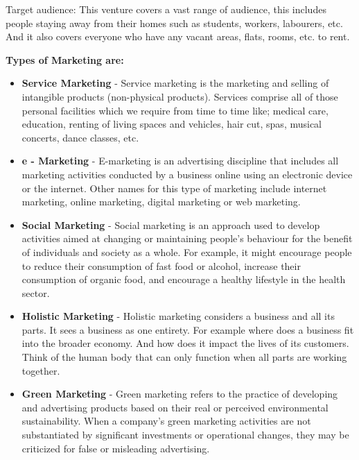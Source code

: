 \documentclass{article}
\begin{document}
Target audience: This venture covers a vast range of audience, this includes people staying away from their homes such as students, workers, labourers, etc. And it also covers everyone who have any vacant areas, flats, rooms, etc. to rent.

\setlength{\parskip}{1em}

\large{\textbf{Types of Marketing are: }}
\begin{itemize}
    \item {\textbf{Service Marketing}} - Service marketing is the marketing and selling of intangible products (non-physical products). Services comprise all of those personal facilities which we require from time to time like; medical care, education, renting of living spaces and vehicles, hair cut, spas, musical concerts, dance classes, etc.
    \item {\textbf{e - Marketing}} - E-marketing is an advertising discipline that includes all marketing activities conducted by a business online using an electronic device or the internet. Other names for this type of marketing include internet marketing, online marketing, digital marketing or web marketing.
    \item {\textbf{Social Marketing}} - Social marketing is an approach used to develop activities aimed at changing or maintaining people's behaviour for the benefit of individuals and society as a whole. For example, it might encourage people to reduce their consumption of fast food or alcohol, increase their consumption of organic food, and encourage a healthy lifestyle in the health sector.
    \item {\textbf{Holistic Marketing}} - Holistic marketing considers a business and all its parts. It sees a business as one entirety. For example where does a business fit into the broader economy. And how does it impact the lives of its customers. Think of the human body that can only function when all parts are working together.
    \item {\textbf{Green Marketing}} - Green marketing refers to the practice of developing and advertising products based on their real or perceived environmental sustainability. When a company's green marketing activities are not substantiated by significant investments or operational changes, they may be criticized for false or misleading advertising.
\end{itemize}
\end{document}
